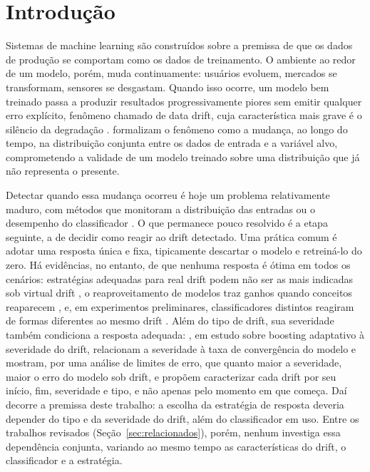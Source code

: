 \chapter*[Introdução]{Introdução}
Sistemas de machine learning são construídos sobre a premissa de que os dados
de produção se comportam como os dados de treinamento. O ambiente ao redor de
um modelo, porém, muda continuamente: usuários evoluem, mercados se
transformam, sensores se desgastam. Quando isso ocorre, um modelo bem
treinado passa a produzir resultados progressivamente piores sem emitir
qualquer erro explícito, fenômeno chamado de data drift, cuja característica
mais grave é o silêncio da degradação \cite{sculley2015}. 
formalizam o fenômeno como a mudança, ao longo do tempo, na distribuição
conjunta entre os dados de entrada e a variável alvo, comprometendo a validade
de um modelo treinado sobre uma distribuição que já não representa o presente.

Detectar quando essa mudança ocorreu é hoje um problema relativamente maduro,
com métodos que monitoram a distribuição das entradas ou o desempenho do
classificador \cite{bayram2022}. O que permanece pouco resolvido é a etapa
seguinte, a de decidir como reagir ao drift detectado. Uma prática comum é
adotar uma resposta única e fixa, tipicamente descartar o modelo e
retreiná-lo do zero. Há evidências, no entanto, de que nenhuma resposta é
ótima em todos os cenários: estratégias adequadas para real drift podem não
ser as mais indicadas sob virtual drift \cite{oliveira2023}, o
reaproveitamento de modelos traz ganhos quando conceitos reaparecem
\cite{sun2018}, e, em experimentos preliminares, classificadores distintos
reagiram de formas diferentes ao mesmo drift \cite{webb2016}. Além do tipo de drift, sua
severidade também condiciona a resposta adequada: ,
em estudo sobre boosting adaptativo à severidade do drift,
relacionam a severidade à taxa de convergência do modelo e mostram, por uma
análise de limites de erro, que quanto maior a severidade, maior o erro do
modelo sob drift, e  propõem caracterizar cada
drift por seu início, fim, severidade e tipo, e não apenas pelo momento em que
começa. Daí
decorre a premissa deste trabalho: a escolha da estratégia de resposta
deveria depender do tipo e da severidade do drift, além do classificador em
uso. Entre os trabalhos revisados (Seção~\ref{sec:relacionados}), porém,
nenhum investiga essa dependência conjunta, variando ao mesmo tempo as
características do drift, o classificador e a estratégia.

